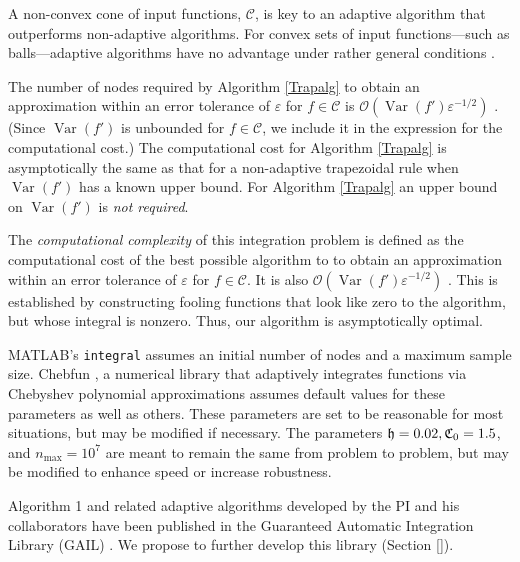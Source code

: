 \documentclass[11pt]{NSFamsart}
\newcommand{\hcut}{\frak{h}}
\DeclareMathOperator{\Var}{Var}
\newcommand{\cc}{\mathcal{C}}
\newcommand{\fC}{\mathfrak{C}}
\newcommand{\Order}{\mathcal{O}}
\begin{document}
\begin{description}[leftmargin=2.5ex]
\vspace{-4ex}
  \noindent A non-convex cone of input functions, $\cc$, is key to an adaptive algorithm 
  that outperforms non-adaptive algorithms.  For convex sets of input functions---such as 
  balls---adaptive algorithms have no 
  advantage under rather 
  general conditions  \cite[Chap.\ 4, Corollary 5.2.1]{TraWasWoz88}.
	

	\item[Bound the computational cost of the algorithm] The number of nodes required by 
	Algorithm \ref{Trapalg} to obtain an 
	approximation 
	within an error tolerance 
	of $\varepsilon$ for $f \in \cc$ is $\Order (\Var(f')\varepsilon^{-1/2})$ \cite{HicRazYun15a}.  
	(Since $\Var(f')$ is unbounded for $f \in \cc$, we 
	include it in the expression for the computational cost.)  The computational cost for Algorithm 
	\ref{Trapalg} is asymptotically the same as that for a non-adaptive trapezoidal rule when 
	$\Var(f')$ has a known 
	upper bound.  For 
	Algorithm \ref{Trapalg} an upper bound on $\Var(f')$ is \emph{not required}.
	
	\item[Show that the adaptive algorithm is optimal] The \emph{computational complexity} of this 
	integration problem is defined as the 
	computational cost of the best 
	possible 
	algorithm to to obtain an approximation within an error tolerance 
	of $\varepsilon$ for $f \in \cc$.  It is also $\Order (\Var(f')\varepsilon^{-1/2})$ 
	\cite{HicRazYun15a}.  This 
	is 
	established by constructing fooling functions that look like zero to the algorithm, but whose 
	integral is nonzero. Thus, our algorithm is asymptotically optimal.
	
	\item[The definition of adaptive algorithm includes parameters] MATLAB's 
	\texttt{integral} \cite{MAT9.3}
	assumes an initial number of nodes and a maximum sample size.  Chebfun 
	\cite{TrefEtal17a}, a 
	numerical 
	library that adaptively integrates functions via Chebyshev polynomial approximations 
	assumes 
	default values for these parameters as well as others.
	These parameters are set to be reasonable for most situations, but may be modified if 
	necessary.  The parameters  $\hcut = 0.02, \fC_0 = 
	1.5$, and 
	$n_{\max} = 10^7$ are meant to remain the same from problem to problem, but may be 
	modified 
	to 
	enhance speed or increase robustness.
	
	\item[The adaptive algorithm is available]  Algorithm 1 and related adaptive algorithms 
	developed 
	by the PI and his collaborators have been published in the Guaranteed Automatic 
	Integration 
	Library (GAIL) \cite{ChoEtal17b}.  We propose to further develop this library (Section 
	\ref{}).
	

\end{description}
\end{document}
